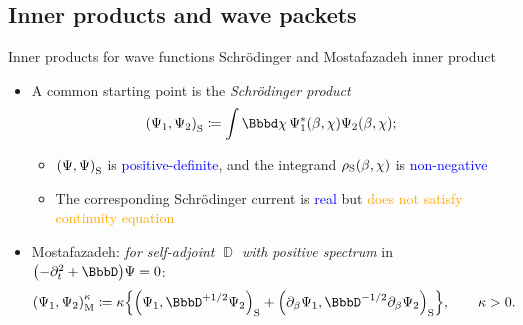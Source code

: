 \documentclass[8pt]{beamer}
\begin{document}
\subsection{Inner products and wave packets}

\begin{frame}%
{Inner products for wave functions}%
{Schrödinger and Mostafazadeh inner product}

\begin{itemize}


\item A common starting point is the
\emph{Schrödinger product}
\begin{align}
\rbr{\Psi_1,\Psi_2}_\text{S} \coloneqq
\int \dd \chi\,\rfun{\Psi_1^*}{\beta,\chi} \rfun{\Psi_2}{\beta,\chi};
\end{align}

\begin{itemize}
\item ${\left(\Psi, \Psi\right)}_\text{S}$ is \textcolor{blue}{positive-definite},
and the integrand ${\rho_\text{S}}\mathopen{}\left(\beta,\chi\right)\mathclose{}$ is
\textcolor{blue}{non-negative}

\item The corresponding Schrödinger current is \textcolor{blue}{real} but
\textcolor{orange}{does not satisfy continuity equation}
\end{itemize}

\item Mostafazadeh: \emph{for self-adjoint $\BbbD$ with positive spectrum} in $\rbr{-\partial_t^2+\BbbD}\Psi = 0$:
\begin{align}
\rbr{\Psi_1,\Psi_2}_\text{M}^{\kappa} &\coloneqq\kappa\cbr{
\rbr{\Psi_1,\BbbD^{+1/2}\Psi_2}_\text{S}
+\rbr{\partial_\beta\Psi_1,
\BbbD^{-1/2}\partial_\beta\Psi_2}_\text{S}}, \qquad \kappa > 0.
\end{align}


\end{itemize}
\end{frame}
\end{document}
